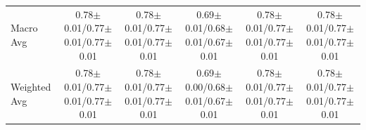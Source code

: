 \documentclass[10pt,a4paper,parskip=half-]{scrartcl}
\begin{document}
\begin{landscape}
\begin{table}[H]
{\begin{tabular}{l|cccc|cccc|cccc|cccc|cccc}
Macro Avg & \multicolumn{4}{c|}{0.78$\pm$0.01/0.77$\pm$0.01/0.77$\pm$0.01} & \multicolumn{4}{c|}{0.78$\pm$0.01/0.77$\pm$0.01/0.77$\pm$0.01} & \multicolumn{4}{c|}{0.69$\pm$0.01/0.68$\pm$0.01/0.67$\pm$0.01} & \multicolumn{4}{c|}{0.78$\pm$0.01/0.77$\pm$0.01/0.77$\pm$0.01} & \multicolumn{4}{c}{0.78$\pm$0.01/0.77$\pm$0.01/0.77$\pm$0.01} \\
Weighted Avg & \multicolumn{4}{c|}{0.78$\pm$0.01/0.77$\pm$0.01/0.77$\pm$0.01} & \multicolumn{4}{c|}{0.78$\pm$0.01/0.77$\pm$0.01/0.77$\pm$0.01} & \multicolumn{4}{c|}{0.69$\pm$0.00/0.68$\pm$0.01/0.67$\pm$0.01} & \multicolumn{4}{c|}{0.78$\pm$0.01/0.77$\pm$0.01/0.77$\pm$0.01} & \multicolumn{4}{c}{0.78$\pm$0.01/0.77$\pm$0.01/0.77$\pm$0.01} \\
\bottomrule
\end{tabular}}
\end{table}


\end{landscape}
\end{document}
